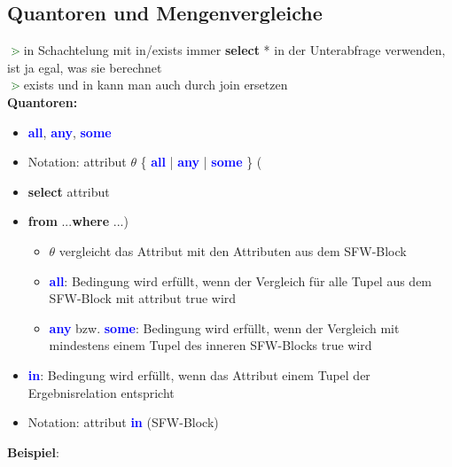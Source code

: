 \documentclass{scrartcl}
\newcommand{\key}[1]{{\textcolor{blue}{\textbf{#1}}}}
\newcommand{\hint}{{\textcolor{darkgreen}{\textbf{$\gtrdot$}}}}
\newcommand{\select}{\textbf{select }}
\newcommand{\from}{\textbf{from }}
\newcommand{\where}{\textbf{where }}
\begin{document}
\subsection{Quantoren und Mengenvergleiche}

\hint in Schachtelung mit in/exists immer \select * in der Unterabfrage verwenden, ist ja egal, was sie berechnet \\
\hint exists und in kann man auch durch join ersetzen \\

\textbf{Quantoren:}
\begin{itemize}
	\itemsep0em
	\item \key{all}, \key{any}, \key{some}
	\item Notation: attribut $\theta$ \{ \key{all} | \key{any} | \key{some} \} (
	\item[] \select attribut
	\item[] \from ...\where ...)
	\begin{itemize}
		\item $\theta$ vergleicht das Attribut mit den Attributen aus dem SFW-Block
		\item \key{all}: Bedingung wird erfüllt, wenn der Vergleich für alle Tupel aus dem SFW-Block mit attribut true wird
		\item \key{any} bzw. \key{some}: Bedingung wird erfüllt, wenn der Vergleich mit mindestens einem Tupel des inneren SFW-Blocks true wird
	\end{itemize}
	\item \key{in}: Bedingung wird erfüllt, wenn das Attribut einem Tupel der Ergebnisrelation entspricht
	\item Notation: attribut \key{in} (SFW-Block)
\end{itemize}

\textbf{Beispiel}: \\
\end{document}
